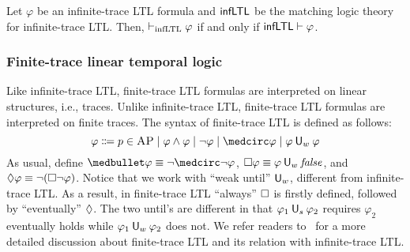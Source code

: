 \documentclass{amsart}
\begin{document}
\begin{theorem}Let $\varphi$ be an infinite-trace LTL formula and $\mathsf{infLTL}$ be the matching
	logic theory for infinite-trace LTL.
	Then,
	$\vdash_{\mathrm{infLTL}} \varphi$ if and only if
	$\mathsf{infLTL} \vdash \varphi$.
	\label{thm_csrvext_infLTL}
\end{theorem}

\subsubsection{Finite-trace linear temporal logic}
Like infinite-trace LTL,
finite-trace LTL formulas are interpreted on linear structures, i.e., traces.
Unlike infinite-trace LTL, finite-trace LTL formulas
are interpreted on finite traces.
The syntax of finite-trace LTL is defined as follows:
$$
\varphi \Coloneqq
p \in \AP \mid
\varphi \wedge \varphi \mid
\neg \varphi \mid
\wnext \varphi \mid
\varphi \Uw \varphi
$$
As usual,
define $\snext \varphi \equiv \neg \wnext \neg \varphi$,
${\square} \varphi \equiv \varphi \mathbin{\mathsf{U}_w} \mathit{false}$, and
${\lozenge} \varphi \equiv \neg ({\square} \neg \varphi)$.
Notice that we work with ``weak until'' $\mathbin{\mathsf{U}_w}$, different from infinite-trace
LTL.
As a result, in finite-trace LTL ``always'' ${\square}$ is firstly defined,
followed by ``eventually'' ${\lozenge}$.
The two until's are different in that
$\varphi_1 \mathbin{\mathsf{U}_s} \varphi_2$ requires $\varphi_2$ eventually holds while
$\varphi_1 \mathbin{\mathsf{U}_w} \varphi_2$ does not.
We refer readers to~\cite{bibid} for a more detailed discussion about
finite-trace LTL and its relation with infinite-trace LTL.
\end{document}
